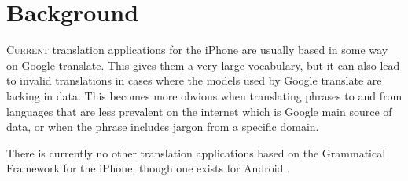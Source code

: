 \chapter{Background}
\lettrine[lines=4, loversize=-0.1, lraise=0.1]{C}{urrent} translation applications for the iPhone are usually based in some way on Google translate. This gives them a very large vocabulary, but it can also lead to invalid translations in cases where the models used by Google translate are lacking in data. This becomes more obvious when translating phrases to and from languages that are less prevalent on the internet which is Google main source of data, or when the phrase includes jargon from a specific domain.

There is currently no other translation applications based on the Grammatical Framework for the iPhone, though one exists for Android \cite{phrasedroid}.
